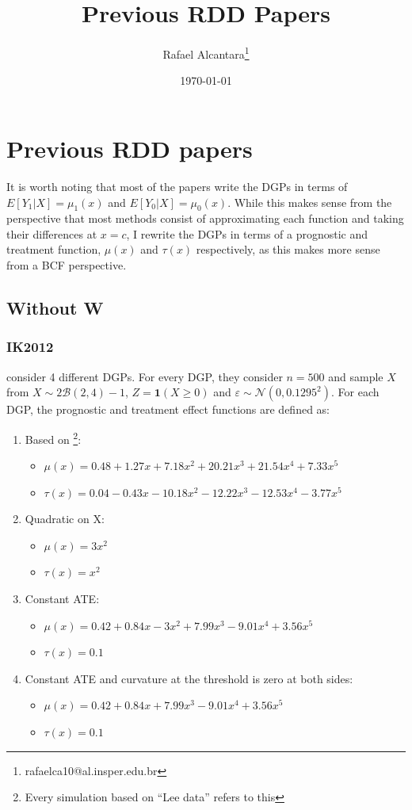 \documentclass[11pt]{article}
\author{Rafael Alcantara\thanks{rafaelca10@al.insper.edu.br}}
\date{\today}
\title{Previous RDD Papers}
\begin{document}
\maketitle
\tableofcontents

\section{Previous RDD papers}
\label{sec:orgbef6825}
It is worth noting that most of the papers write the DGPs in
terms of \(E[Y_1|X]=\mu_1(x)\) and \(E[Y_0|X]=\mu_0(x)\). While
this makes sense from the perspective that most methods
consist of approximating each function and taking their
differences at \(x=c\), I rewrite the DGPs in terms of a
prognostic and treatment function, \(\mu(x)\) and \(\tau(x)\)
respectively, as this makes more sense from a BCF
perspective.
\subsection{Without W}
\label{sec:org925f748}
\subsubsection{IK2012}
\label{sec:org20d4a96}
\cite{imbens2012optimal} consider 4 different DGPs. For every
DGP, they consider \(n=500\) and sample \(X\) from \(X \sim 2
\mathcal{B}(2,4) - 1\), \(Z = \mathbf{1}(X \geq 0)\) and
\(\varepsilon \sim \mathcal{N}(0,0.1295^2)\). For each DGP,
the prognostic and treatment effect functions are defined
as:

\begin{enumerate}
\item Based on \cite{lee2008randomized}\footnote{Every simulation based on ``Lee data'' refers to this}:
\begin{itemize}
\item \(\mu(x) = 0.48 + 1.27 x + 7.18 x^2 + 20.21 x^3 + 21.54
     x^4 + 7.33 x^5\)
\item \(\tau(x) = 0.04 - 0.43 x - 10.18 x^2 - 12.22 x^3 - 12.53
     x^4 - 3.77 x^5\)
\end{itemize}
\item Quadratic on X:
\begin{itemize}
\item \(\mu(x) = 3 x^2\)
\item \(\tau(x) = x ^2\)
\end{itemize}
\item Constant ATE:
\begin{itemize}
\item \(\mu(x) = 0.42 + 0.84 x - 3 x^2 + 7.99 x^3 - 9.01 x^4 +
     3.56 x^5\)
\item \(\tau(x) = 0.1\)
\end{itemize}
\item Constant ATE and curvature at the threshold is zero at
both sides:
\begin{itemize}
\item \(\mu(x) = 0.42 + 0.84 x + 7.99 x^3 - 9.01 x^4 + 3.56
     x^5\)
\item \(\tau(x) = 0.1\)
\end{itemize}
\end{enumerate}
\end{document}
